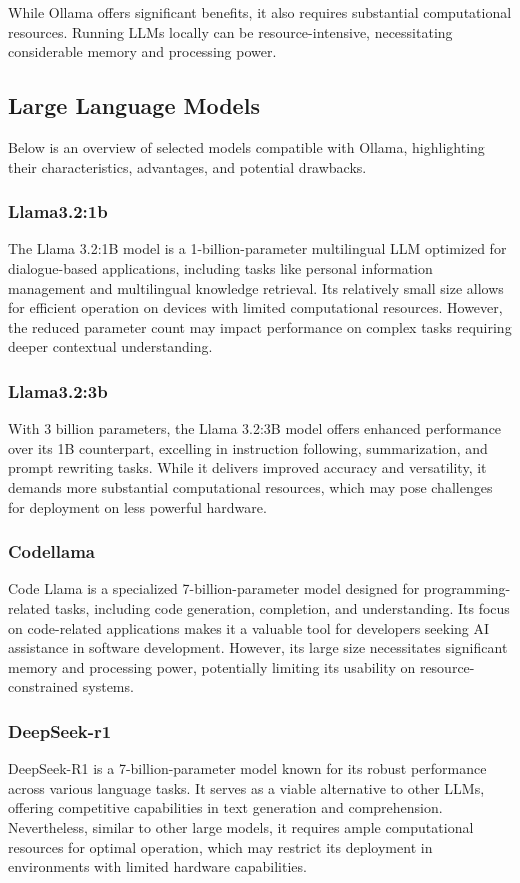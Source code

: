 \documentclass[12pt]{article}
\begin{document}
While Ollama offers significant benefits, it also requires substantial computational resources. Running LLMs locally can be resource-intensive, necessitating considerable memory and processing power.

\subsection{Large Language Models}
Below is an overview of selected models compatible with Ollama, highlighting their characteristics, advantages, and potential drawbacks.

\subsubsection{Llama3.2:1b}
The Llama 3.2:1B model is a 1-billion-parameter multilingual LLM optimized for dialogue-based applications, including tasks like personal information management and multilingual knowledge retrieval. Its relatively small size allows for efficient operation on devices with limited computational resources. However, the reduced parameter count may impact performance on complex tasks requiring deeper contextual understanding. \cite{ollama}

\subsubsection{Llama3.2:3b}
With 3 billion parameters, the Llama 3.2:3B model offers enhanced performance over its 1B counterpart, excelling in instruction following, summarization, and prompt rewriting tasks. While it delivers improved accuracy and versatility, it demands more substantial computational resources, which may pose challenges for deployment on less powerful hardware. \cite{ollama}

\subsubsection{Codellama}
Code Llama is a specialized 7-billion-parameter model designed for programming-related tasks, including code generation, completion, and understanding. Its focus on code-related applications makes it a valuable tool for developers seeking AI assistance in software development. However, its large size necessitates significant memory and processing power, potentially limiting its usability on resource-constrained systems. \cite{codellama}

\subsubsection{DeepSeek-r1}
DeepSeek-R1 is a 7-billion-parameter model known for its robust performance across various language tasks. It serves as a viable alternative to other LLMs, offering competitive capabilities in text generation and comprehension. Nevertheless, similar to other large models, it requires ample computational resources for optimal operation, which may restrict its deployment in environments with limited hardware capabilities. \cite{deepseek}
\end{document}
